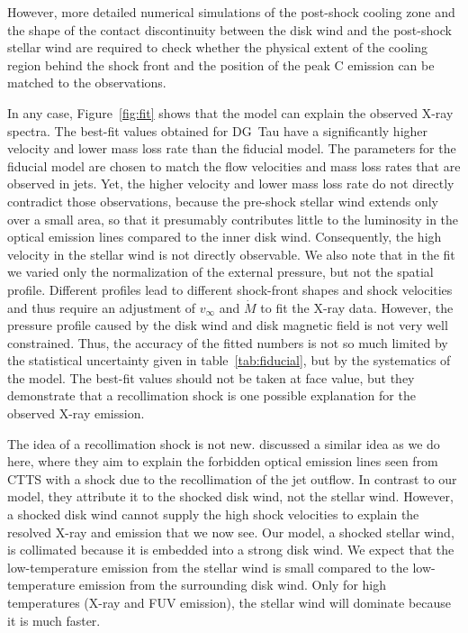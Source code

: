 However, more detailed numerical simulations of the post-shock cooling zone and the shape of the contact discontinuity between the disk wind and the post-shock stellar wind are required to check whether the physical extent of the cooling region behind the shock front and the position of the peak  C emission can be matched to the observations.

In any case, Figure~\ref{fig:fit} shows that the model can explain the observed X-ray spectra. The best-fit values obtained for DG~Tau have a significantly higher velocity and lower mass loss rate than the fiducial model. The parameters for the fiducial model are chosen to match the flow velocities and mass loss rates that are observed in jets. Yet, the higher velocity and lower mass loss rate do not directly contradict those observations, because the pre-shock stellar wind extends only over a small area, so that it presumably contributes little to the luminosity in the optical emission lines compared to the inner disk wind. Consequently, the high velocity in the stellar wind is not directly observable. We also note that in the fit we varied only the normalization of the external pressure, but not the spatial profile. Different profiles lead to different shock-front shapes and shock velocities and thus require an adjustment of $v_\infty$ and $\dot M$ to fit the X-ray data. However, the pressure profile caused by the disk wind and disk magnetic field is not very well constrained. Thus, the accuracy of the fitted numbers is not so much limited by the statistical uncertainty given in table~\ref{tab:fiducial}, but by the systematics of the model. The best-fit values should not be taken at face value, but they demonstrate that a recollimation shock is one possible explanation for the observed X-ray emission. 

The idea of a recollimation shock is not new.
\citet{1993ApJ...409..748G} discussed a similar idea as we do here, where they aim to explain the forbidden optical emission lines seen from CTTS with a shock due to the recollimation of the jet outflow. In contrast to our model, they attribute it to the shocked disk wind, not the stellar wind. However, a shocked disk wind cannot supply the high shock velocities to explain the resolved X-ray and  emission that we now see. Our model, a shocked stellar wind, is collimated because it is embedded into a strong disk wind. We expect that the low-temperature emission from the stellar wind is small compared to the low-temperature emission from the surrounding disk wind. Only for high temperatures (X-ray and FUV emission), the stellar wind will dominate because it is much faster.

